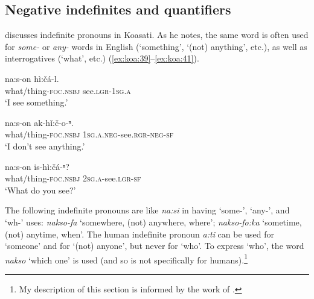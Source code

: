 \documentclass[output=paper,colorlinks,citecolor=brown]{langscibook}
\begin{document}

\subsection{Negative indefinites and quantifiers}\label{sec:koa:3.2}
\citet[423ff]{Kimball1991} discusses indefinite pronouns in Koasati. As he notes, the same word is often used for \textit{some-} or \textit{any-} words in English (‘something’, ‘(not) anything’, etc.), as well as interrogatives (‘what’, etc.) (\ref{ex:koa:39}--\ref{ex:koa:41}).

\ea\label{ex:koa:39}
    \gll na:s-on  hì:čá-l. \\ 
         what/thing-\textsc{foc}.\textsc{nsbj}  see.\textsc{lgr}-1\textsc{sg.a} \\
    \glt ‘I see something.’
\z 

\ea\label{ex:koa:40}
    \gll na:s-on  ak-hǐ:č-o-ⁿ.\\ 
         what/thing-\textsc{foc}.\textsc{nsbj}  1\textsc{sg.a}.\textsc{neg}-see.\textsc{rgr}-\textsc{neg}-\textsc{sf} \\
    \glt ‘I don’t see anything.’
\z 

\ea\label{ex:koa:41}
    \gll na:s-on  is-hì:čá-ⁿ?\\ 
         what/thing-\textsc{foc}.\textsc{nsbj}  2\textsc{sg.a}-see.\textsc{lgr}-\textsc{sf} \\
    \glt ‘What do you see?’
\z 

The following indefinite pronouns are like \textit{na:si} in having ‘{some}-', ‘{any}-', and ‘{wh}-' uses: \textit{nakso-fa} ‘somewhere, (not) anywhere, where'; \textit{nakso-fo:ka} ‘sometime, (not) anytime, when'. The human indefinite pronoun \textit{a:ti} can be used for ‘someone' and for ‘(not) anyone', but never for ‘who'. To express ‘who', the word \textit{nakso} ‘which one' is used (and so is not specifically for humans).\footnote{My description of this section is informed by the work of \citet{Haspelmath1997}.}
\end{document}
